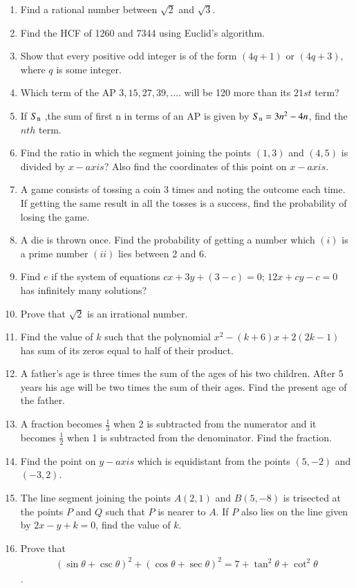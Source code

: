 \documentclass[12pt,-letter paper]{article}
\begin{document}
\begin{enumerate}
\begin{figure}[H]
			
		\end{figure}  
\item Find a rational number between $\sqrt{2}$ and $\sqrt{3}$.
\item Find the HCF of 1260 and 7344 using Euclid's algorithm.
\item Show that every positive odd integer is of the form $(4q+1)$ or $(4q+3)$, where $q$ is some integer.
\item Which term of the AP $3, 15, 27, 39, ....$ will be 120 more than its $21st$ term?
\item If $S\textsubscript{n}$ ,the sum of first n in terms of an AP is given by $S\textsubscript{n}=3n^2-4n$, find the $nth$ term.
\item Find the ratio in which the segment joining the points $(1, 3)$ and $(4, 5)$ is divided by $x-axis$? Also find the coordinates of this point on $x-axis$.
\item A game consists of tossing a coin 3 times and noting the outcome each time. If getting the same result in all the tosses is a success, find the probability of losing the game.
\item A die is thrown once. Find the probability of getting a number which $(i)$ is a prime number $(ii)$ lies between 2 and 6.
\item Find $e$ if the system of equations $cx+3y+(3-c)=0$; $12x+cy-c=0$ has infinitely many solutions?
\item Prove that $\sqrt{2}$ is an irrational number.
\item Find the value of $k$ such that the polynomial $ x^2-(k+6)x+2(2k-1)$ has sum of its zeros equal to half of their product.
\item A father's age is three times the sum of the ages of his two children. After 5 years his age will be two times the sum of their ages. Find the present age of the father.
\item A fraction becomes $\frac{1}{3}$ when 2 is subtracted from the numerator and it becomes $\frac{1}{2}$ when 1 is subtracted from the denominator. Find the fraction.
\item Find the point on $y-axis$ which is equidistant from the points $(5, -2)$ and $(-3, 2)$.
\item The line segment joining the points $A(2, 1)$ and $B(5, -8)$ is trisected at the points $P$ and $Q$ such that $P$ is nearer to $A$. If $P$ also lies on the line given by $2x-y+k=0$, find the value of $k$.
\item Prove that \begin{align*} (\sin\theta + \csc\theta)^2 + (\cos\theta + \sec\theta)^2 = 7 + \tan^2\theta + \cot^2\theta\end{align*}.

\end{enumerate}
\end{document}
